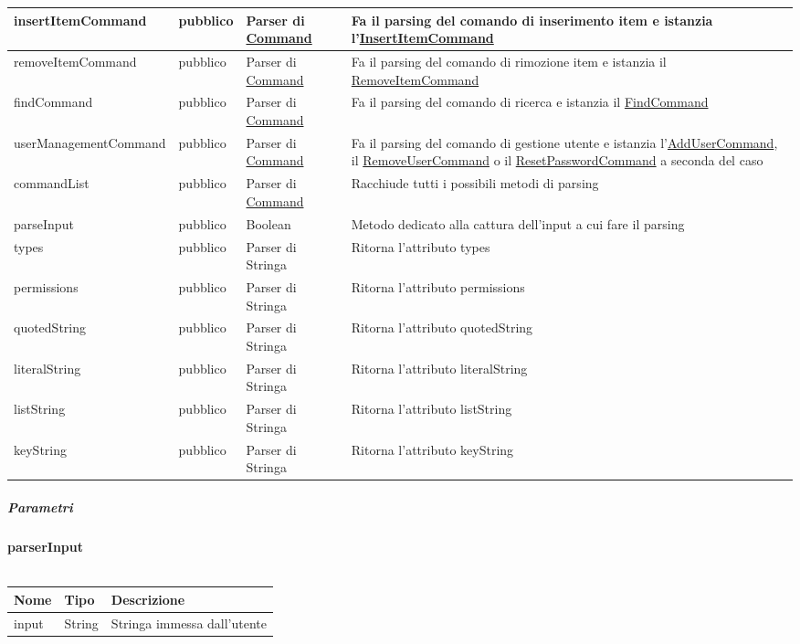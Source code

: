 \documentclass{scalatekids-article}
\begin{document}
\begin{longtable}{| p{5.5cm} | p{1.5cm} | p{2cm} | p{7.5cm} |}
  \hline
  insertItemCommand & pubblico & Parser di \hyperref[sec:actorbase::cli::models::Command]{Command} & Fa il parsing del comando di inserimento item e istanzia l'\hyperref[sec:actorbase::cli::models::InsertItemCommand]{InsertItemCommand}\\
  \hline
  removeItemCommand & pubblico & Parser di \hyperref[sec:actorbase::cli::models::Command]{Command} & Fa il parsing del comando di rimozione item e istanzia il \hyperref[sec:actorbase::cli::models::RemoveItemCommand]{RemoveItemCommand}\\
  \hline
  findCommand & pubblico & Parser di \hyperref[sec:actorbase::cli::models::Command]{Command} & Fa il parsing del comando di ricerca e istanzia il \hyperref[sec:actorbase::cli::models::FindCommand]{FindCommand}\\
  \hline
  userManagementCommand & pubblico & Parser di \hyperref[sec:actorbase::cli::models::Command]{Command} & Fa il parsing del comando di gestione utente e istanzia l'\hyperref[sec:actorbase::cli::models::AddUserCommand]{AddUserCommand}, il \hyperref[sec:actorbase::cli::models::RemoveUserCommand]{RemoveUserCommand} o il \hyperref[sec:actorbase::cli::models::ResetPasswordCommand]{ResetPasswordCommand} a seconda del caso\\
  \hline
  commandList & pubblico & Parser di \hyperref[sec:actorbase::cli::models::Command]{Command} & Racchiude tutti i possibili metodi di parsing\\
  \hline
  parseInput & pubblico & Boolean & Metodo dedicato alla cattura dell'input a cui fare il parsing\\
  \hline
  types & pubblico & Parser di Stringa & Ritorna l'attributo types\\
  \hline
  permissions & pubblico & Parser di Stringa & Ritorna l'attributo permissions\\
  \hline
  quotedString & pubblico & Parser di Stringa & Ritorna l'attributo quotedString\\
  \hline
  literalString & pubblico & Parser di Stringa & Ritorna l'attributo literalString\\
  \hline
  listString & pubblico & Parser di Stringa & Ritorna l'attributo listString\\
  \hline
  keyString & pubblico & Parser di Stringa & Ritorna l'attributo keyString\\
  \hline
\end{longtable}

\subparagraph{Parametri}


\textbf{parserInput}\\ \\
\begin{tabular}{| p{3cm} | p{3.5cm} | p{8.5cm} |}
  \hline
  Nome & Tipo & Descrizione\\
  \hline
  input & String & Stringa immessa dall'utente\\
  \hline
\end{tabular}\\
\end{document}
